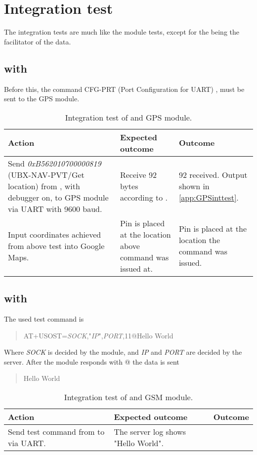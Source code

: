 \section{Integration test}
The integration tests are much like the module tests, except for the \MKR being the facilitator of the data.

\subsection{\MKR with \GPS}
Before this, the command CFG-PRT (Port Configuration for UART) \cite[p.~119-120]{NEO7_proto}, must be sent to the GPS module.

\begin{table}[H]
	\centering
	\begin{tabularx}{\textwidth}{p{4.3cm} X X}
		\toprule
		\textbf{Action} & \textbf{Expected outcome} & \textbf{Outcome} \\
		\midrule
		Send \textit{0xB562010700000819} (UBX-NAV-PVT/Get location) from \MKR, with debugger on, to GPS module via UART with \num{9600} baud. & Receive \num{92} bytes according to \cite[p.~160-161]{NEO7_proto}. & \SI{92}{\byte} received. Output shown in \cref{app:GPSinttest}. \\
		Input coordinates achieved from above test into Google Maps. & Pin is placed at the location above command was issued at. & Pin is placed at the location the command was issued. \\
		\bottomrule
	\end{tabularx}
	\caption{Integration test of \MKR and \GPS GPS module.}
	\label{AT:intGPS}
\end{table}

\subsection{\MKR with \SARA}
The used test command is 
\begin{quote}
	AT+USOST=\textit{SOCK},"\textit{IP}",\textit{PORT},11@Hello World
\end{quote}
Where \textit{SOCK} is decided by the \SARA module, and \textit{IP} and \textit{PORT} are decided by the server.\newline \newline
After the module responds with @ the data is sent
\begin{quote}
	Hello World
\end{quote}

\begin{table}[H]
	\centering
	\begin{tabularx}{\textwidth}{p{4.3cm} X X}
		\toprule
		\textbf{Action} & \textbf{Expected outcome} & \textbf{Outcome} \\
		\midrule
		Send test command from \MKR to \SARA via UART. & The server log shows "Hello World". & \\
		\bottomrule
	\end{tabularx}
	\caption{Integration test of \MKR and \SARA GSM module.}
	\label{AT:intGSM}
\end{table}


